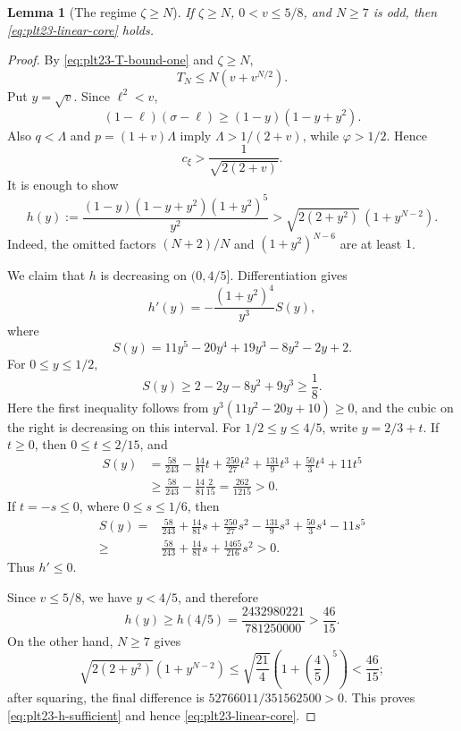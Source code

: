 \documentclass[11pt]{article}
\newtheorem{lemma}[theorem]{Lemma}
\numberwithin{equation}{section}
\begin{document}
\begin{lemma}[The regime $\zeta\ge N$]\label{lem:plt23-linear-high-zeta}
  If $\zeta\ge N$, $0<v\le5/8$, and $N\ge7$ is odd, then \eqref{eq:plt23-linear-core} holds.
\end{lemma}

\begin{proof}
  By \eqref{eq:plt23-T-bound-one} and $\zeta\ge N$,
  \begin{equation}\label{eq:plt23-T-high-zeta}
    T_N\le N(v+v^{N/2}).
  \end{equation}
  Put $y=\sqrt v$.
  Since $\ell^2<v$,
  \[
    (1-\ell)(\sigma-\ell)
    \ge(1-y)(1-y+y^2).
  \]
  Also $q<\Lambda$ and $p=(1+v)\Lambda$ imply $\Lambda>1/(2+v)$, while $\varphi>1/2$.
  Hence
  \begin{equation}\label{eq:plt23-cxi-crude}
    c_\xi>\frac{1}{\sqrt{2(2+v)}}.
  \end{equation}
  It is enough to show
  \begin{equation}\label{eq:plt23-h-sufficient}
    h(y):=
    \frac{(1-y)(1-y+y^2)(1+y^2)^5}{y^2}
    >\sqrt{2(2+y^2)}\,(1+y^{N-2}).
  \end{equation}
  Indeed, the omitted factors $(N+2)/N$ and $(1+y^2)^{N-6}$ are at least $1$.

  We claim that $h$ is decreasing on $(0,4/5]$.
  Differentiation gives
  \[
    h'(y)=-\frac{(1+y^2)^4}{y^3}S(y),
  \]
  where
  \[
    S(y)=11y^5-20y^4+19y^3-8y^2-2y+2.
  \]
  For $0\le y\le1/2$,
  \[
    S(y)\ge2-2y-8y^2+9y^3\ge\frac{1}{8}.
  \]
  Here the first inequality follows from $y^3(11y^2-20y+10)\ge0$, and the cubic on the right is decreasing on this interval.
  For $1/2\le y\le4/5$, write $y=2/3+t$.
  If $t\ge0$, then $0\le t\le2/15$, and
  \begin{align*}
    S(y)&=\frac{58}{243}-\frac{14}{81}t
    +\frac{250}{27}t^2+\frac{131}{9}t^3
    +\frac{50}{3}t^4+11t^5\\
    &\ge \frac{58}{243}-\frac{14}{81}\frac{2}{15}
    =\frac{262}{1215}>0.
  \end{align*}
  If $t=-s\le0$, where $0\le s\le1/6$, then
  \begin{align*}
    S(y)={}&\frac{58}{243}+\frac{14}{81}s
    +\frac{250}{27}s^2-\frac{131}{9}s^3
    +\frac{50}{3}s^4-11s^5\\
    \ge{}&\frac{58}{243}+\frac{14}{81}s
    +\frac{1465}{216}s^2>0.
  \end{align*}
  Thus $h'\le0$.

  Since $v\le5/8$, we have $y<4/5$, and therefore
  \[
    h(y)\ge h(4/5)
    =\frac{2432980221}{781250000}>\frac{46}{15}.
  \]
  On the other hand, $N\ge7$ gives
  \[
    \sqrt{2(2+y^2)}(1+y^{N-2})
    \le\sqrt{\frac{21}{4}}
    \left(1+\left(\frac{4}{5}\right)^5\right)
    <\frac{46}{15};
  \]
  after squaring, the final difference is $52766011/351562500>0$.
  This proves \eqref{eq:plt23-h-sufficient} and hence \eqref{eq:plt23-linear-core}.
\end{proof}
\end{document}
